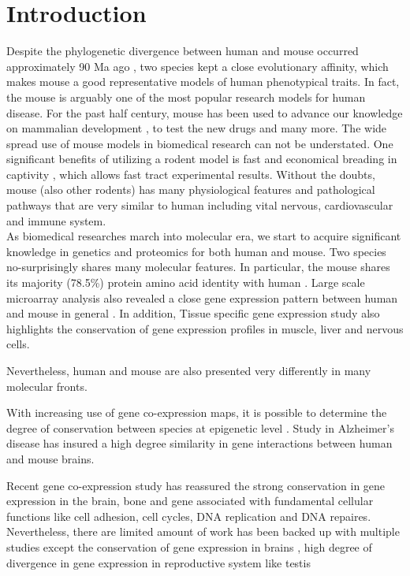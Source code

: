 \section{Introduction}

Despite the phylogenetic divergence between human and mouse occurred approximately 90 Ma ago \cite{Hedges_2006}, two species kept a close evolutionary affinity, which makes mouse a good representative models of human phenotypical traits. In fact, the mouse is arguably one of the most popular research models for human disease. For the past half century, mouse has been used to advance our knowledge on mammalian development \cite{Ueda_2006, Cheon_2011}, to test the new drugs \cite{Van_Dam_2011} and many more. The wide spread use of mouse models in biomedical research can not be understated. \cite{MORSEIII_2007} One significant benefits of utilizing a rodent model is fast and economical breading in captivity \cite{Rosenthal_2007}, which allows fast tract experimental results. \cite{Vandamme_2014} Without the doubts, mouse (also other rodents) has many physiological features and pathological pathways that are very similar to human including vital nervous, cardiovascular and immune system. \cite{MORSEIII_2007,Rosenthal_2007} \\

As biomedical researches march into molecular era, we start to acquire significant knowledge in genetics and proteomics for both human and mouse. Two species no-surprisingly shares many molecular features. In particular, the mouse shares its majority (78.5\%) protein amino acid identity with human \cite{Lindblad_Toh_2001}. Large scale microarray analysis also revealed a close gene expression pattern between human and mouse in general \cite{Liao_2005}. In addition, Tissue specific gene expression study \cite{Zheng_Bradley_2010} also highlights the conservation of gene expression profiles in muscle, liver and nervous cells. 

Nevertheless, human and mouse are also presented very differently in many molecular fronts. 

With increasing use of gene co-expression maps, it is possible to determine the degree of conservation between species at epigenetic level \cite{Stuart_2003,Oldham_2006}. Study in Alzheimer's disease \cite{Miller_2010} has insured a high degree similarity in gene interactions between human and mouse brains. 

Recent gene co-expression study \cite{Monaco_2015} has reassured the strong conservation in gene expression in the brain, bone and gene associated with fundamental cellular functions like cell adhesion, cell cycles, DNA replication and DNA repaires. \cite{Monaco_2015} Nevertheless, there are limited amount of work has been backed up with multiple studies except the conservation of gene expression in brains \cite{Liao_2005, Miller_2010, Chan_2009}, high degree of divergence in gene expression in reproductive system like testis 
\\

